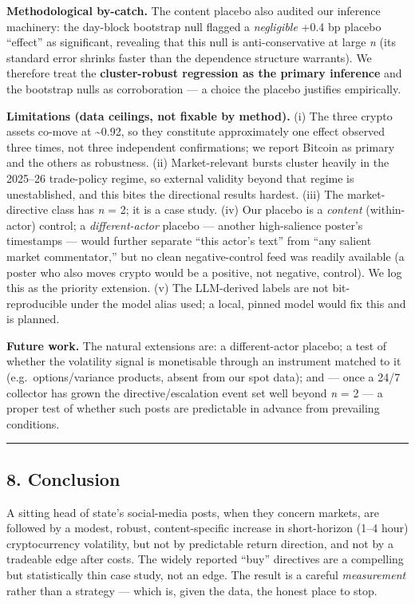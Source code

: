 \documentclass[
]{article}
\begin{document}
\textbf{Methodological by-catch.} The content placebo also audited our
inference machinery: the day-block bootstrap null flagged a
\emph{negligible} +0.4 bp placebo ``effect'' as significant, revealing
that this null is anti-conservative at large \emph{n} (its standard
error shrinks faster than the dependence structure warrants). We
therefore treat the \textbf{cluster-robust regression as the primary
inference} and the bootstrap nulls as corroboration --- a choice the
placebo justifies empirically.

\textbf{Limitations (data ceilings, not fixable by method).} (i) The
three crypto assets co-move at \textasciitilde0.92, so they constitute
approximately one effect observed three times, not three independent
confirmations; we report Bitcoin as primary and the others as
robustness. (ii) Market-relevant bursts cluster heavily in the 2025--26
trade-policy regime, so external validity beyond that regime is
unestablished, and this bites the directional results hardest. (iii) The
market-directive class has \emph{n} = 2; it is a case study. (iv) Our
placebo is a \emph{content} (within-actor) control; a
\emph{different-actor} placebo --- another high-salience poster's
timestamps --- would further separate ``this actor's text'' from ``any
salient market commentator,'' but no clean negative-control feed was
readily available (a poster who also moves crypto would be a positive,
not negative, control). We log this as the priority extension. (v) The
LLM-derived labels are not bit-reproducible under the model alias used;
a local, pinned model would fix this and is planned.

\textbf{Future work.} The natural extensions are: a different-actor
placebo; a test of whether the volatility signal is monetisable through
an instrument matched to it (e.g.~options/variance products, absent from
our spot data); and --- once a 24/7 collector has grown the
directive/escalation event set well beyond \emph{n} = 2 --- a proper
test of whether such posts are predictable in advance from prevailing
conditions.

\begin{center}\rule{0.5\linewidth}{0.5pt}\end{center}

\subsection{8. Conclusion}\label{conclusion}

A sitting head of state's social-media posts, when they concern markets,
are followed by a modest, robust, content-specific increase in
short-horizon (1--4 hour) cryptocurrency volatility, but not by
predictable return direction, and not by a tradeable edge after costs.
The widely reported ``buy'' directives are a compelling but
statistically thin case study, not an edge. The result is a careful
\emph{measurement} rather than a strategy --- which is, given the data,
the honest place to stop.
\end{document}
